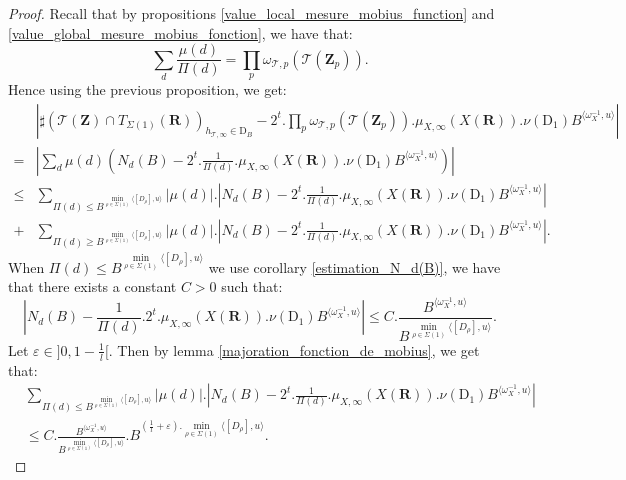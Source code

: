 \documentclass[10pt,a4paper]{amsart}
\newcommand{\R}{\mathbf{R}}
\newcommand{\Z}{\mathbf{Z}}
\newcommand{\stackT}{\mathcal{T}}
\newcommand{\w}{\omega}
\begin{document}
\begin{proof}
    Recall that by propositions \ref{value_local_mesure_mobius_function} and \ref{value_global_mesure_mobius_fonction}, we have that:
    $$\sum\limits_d \frac{\mu(d)}{\Pi(d)} = \prod\limits_p \w_{\stackT,p}(\stackT(\Z_p)) .$$ Hence using the previous proposition, we get:
    \begin{align*}
        &\left| \sharp( \stackT(\Z) \cap T_{\Sigma(1)}(\R) )_{h_{\stackT,\infty} \in \mathrm{D}_B} - 2^t . \prod\limits_p \w_{\stackT,p}(\stackT(\Z_p)) . \mu_{X,\infty}(X(\R)). \nu(\mathrm{D}_1) B^{ \langle \w_{X}^{-1} , u \rangle } \right| \\
        =& \left| \sum\limits_d \mu(d) \left( N_d(B) - 2^t . \frac{1}{\Pi(d)} . \mu_{X,\infty}(X(\R)). \nu(\mathrm{D}_1) B^{ \langle \w_{X}^{-1} , u \rangle } \right) \right| \\
        \leqslant&  \sum\limits_{\Pi(d) \leqslant B^{\min\limits_{\rho \in \Sigma(1)} \langle [D_{\rho}] , u \rangle }} | \mu(d) | . \left| N_d(B) - 2^t . \frac{1}{\Pi(d)} . \mu_{X,\infty}(X(\R)). \nu(\mathrm{D}_1) B^{ \langle \w_{X}^{-1} , u \rangle } \right| \\
        +& \sum\limits_{\Pi(d) \geqslant B^{\min\limits_{\rho \in \Sigma(1)} \langle [D_{\rho}] , u \rangle }} | \mu(d) | . \left| N_d(B) - 2^t . \frac{1}{\Pi(d)} . \mu_{X,\infty}(X(\R)). \nu(\mathrm{D}_1) B^{ \langle \w_{X}^{-1} , u \rangle } \right|.
    \end{align*}
    When $\Pi(d) \leqslant B^{\min\limits_{\rho \in \Sigma(1)} \langle [D_{\rho}] , u \rangle }$ we use corollary \ref{estimation_N_d(B)}, we have that there exists a constant $C > 0$ such that:
    $$\left|  N_d(B) - \frac{1}{\Pi(d)}.2^t.\mu_{X,\infty}(X(\R)). \nu(\mathrm{D}_1) B^{ \langle \w_{X}^{-1} , u \rangle } \right| \leqslant C .\frac{B^{\langle \w_X^{-1},u\rangle}}{B^{ \min\limits_{\rho \in \Sigma(1)} \langle [D_{\rho}],u\rangle } } .$$Let $\varepsilon \in ]0,1-\frac{1}{l}[$. Then by lemma \ref{majoration_fonction_de_mobius}, we get that:
    \begin{align*}
        &\sum\limits_{\Pi(d) \leqslant B^{\min\limits_{\rho \in \Sigma(1)} \langle [D_{\rho}] , u \rangle }} | \mu(d) | . \left| N_d(B) - 2^t . \frac{1}{\Pi(d)} . \mu_{X,\infty}(X(\R)). \nu(\mathrm{D}_1) B^{ \langle \w_{X}^{-1} , u \rangle } \right| \\
         &\leqslant C.\frac{B^{\langle \w_X^{-1},u\rangle}}{B^{ \min\limits_{\rho \in \Sigma(1)} \langle [D_{\rho}],u\rangle } } . B^{(\frac{1}{l} + \varepsilon).\min\limits_{\rho \in \Sigma(1)} \langle [D_{\rho}],u\rangle }.

\end{align*}
\end{proof}
\end{document}
